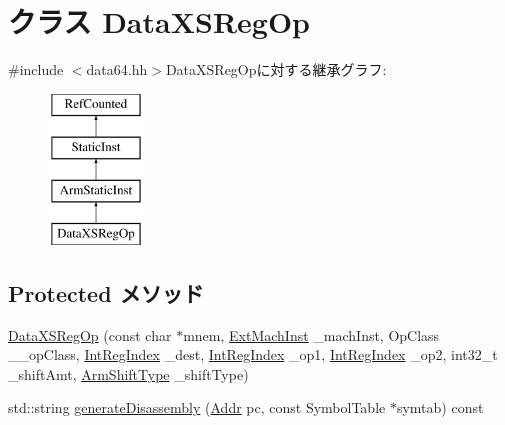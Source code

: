 \hypertarget{classArmISA_1_1DataXSRegOp}{
\section{クラス DataXSRegOp}
\label{classArmISA_1_1DataXSRegOp}
}


{\ttfamily \#include $<$data64.hh$>$}DataXSRegOpに対する継承グラフ:\begin{figure}[H]
\begin{center}
\leavevmode
\includegraphics[height=4cm]{classArmISA_1_1DataXSRegOp}
\end{center}
\end{figure}
\subsection*{Protected メソッド}
\begin{DoxyCompactItemize}
\item 
\hyperlink{classArmISA_1_1DataXSRegOp_a1bfc5b42bca04fd7ed60d4bcccf33987}{DataXSRegOp} (const char $\ast$mnem, \hyperlink{classStaticInst_a5605d4fc727eae9e595325c90c0ec108}{ExtMachInst} \_\-machInst, OpClass \_\-\_\-opClass, \hyperlink{namespaceArmISA_ae64680ba9fb526106829d6bf92fc791b}{IntRegIndex} \_\-dest, \hyperlink{namespaceArmISA_ae64680ba9fb526106829d6bf92fc791b}{IntRegIndex} \_\-op1, \hyperlink{namespaceArmISA_ae64680ba9fb526106829d6bf92fc791b}{IntRegIndex} \_\-op2, int32\_\-t \_\-shiftAmt, \hyperlink{namespaceArmISA_a209d79feaaef0aa2f54ae62e53ee90de}{ArmShiftType} \_\-shiftType)
\item 
std::string \hyperlink{classArmISA_1_1DataXSRegOp_a95d323a22a5f07e14d6b4c9385a91896}{generateDisassembly} (\hyperlink{classm5_1_1params_1_1Addr}{Addr} pc, const SymbolTable $\ast$symtab) const 
\end{DoxyCompactItemize}
